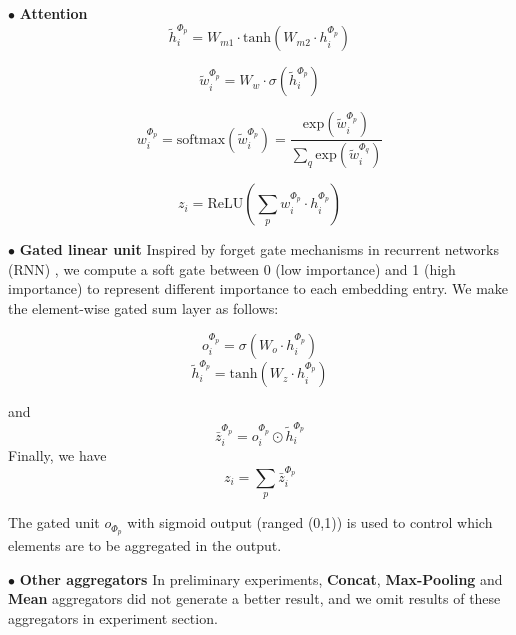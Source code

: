 $\bullet$ \textbf{Attention}
\begin{equation}
\label{eq:mp_mlp}
\tilde{h}^{\Phi_p}_i = W_{m1} \cdot \text{tanh}(W_{m2} \cdot h^{\Phi_p}_i)
\end{equation}

\begin{equation}
\label{eq:mp_attn}
\tilde{w}_i^{\Phi_p} = W_w \cdot \sigma(\tilde{h}^{\Phi_p}_i)
\end{equation}

\begin{equation}
\label{eq:mp_soft}
w_i^{\Phi_p} = \text{softmax}(\tilde{w}_i^{\Phi_p}) = \dfrac{\text{exp}(\tilde{w}_i^{\Phi_p})}{\sum_q \text{exp}(\tilde{w}_i^{\Phi_q})}
\end{equation}

\begin{equation}
\label{eq:mp_asum}
z_i = \text{ReLU}(\sum_p w_i^{\Phi_p} \cdot h^{\Phi_p}_i)
\end{equation}

$\bullet$ \textbf{Gated linear unit}
Inspired by forget gate mechanisms in recurrent networks (RNN) , we compute a soft gate between 0 (low importance) and 1 (high importance) to represent different importance to each embedding entry.
We make the element-wise gated sum layer as follows:
\begin{multicols}{2}
\begin{equation}
o^{\Phi_p}_i=\sigma(W_o \cdot h^{\Phi_p}_i)
\end{equation}\break
\begin{equation}
\tilde{h}^{\Phi_p}_i=\text{tanh}(W_z \cdot h^{\Phi_p}_i)
\end{equation}
\end{multicols}
and 
\begin{equation}
\label{eq:mp_glu}
\bar{z}^{\Phi_p}_i= o^{\Phi_p}_i\odot \tilde{h}^{\Phi_p}_i
\end{equation}
Finally, we have
\begin{equation}
\label{eq:mp_sum}
{z}_i= \sum_p \bar{z}^{\Phi_p}_i
\end{equation}

The gated unit $o_{\Phi_p}$ with sigmoid output (ranged (0,1)) is used to control which elements are to be aggregated in the output. 
 
$\bullet$ \textbf{Other aggregators}
In preliminary experiments, \textbf{Concat}, \textbf{Max-Pooling} and \textbf{Mean} aggregators did not generate a better result, and we omit results of these aggregators in experiment section.

